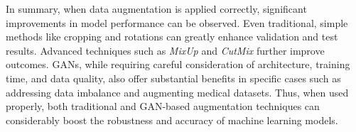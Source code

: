 In summary, when data augmentation is applied correctly, significant improvements in model performance can be observed. Even traditional, simple methods like cropping and rotations can greatly enhance validation and test results. Advanced techniques such as \textit{MixUp} and \textit{CutMix} further improve outcomes. GANs, while requiring careful consideration of architecture, training time, and data quality, also offer substantial benefits in specific cases such as addressing data imbalance and augmenting medical datasets. Thus, when used properly, both traditional and GAN-based augmentation techniques can considerably boost the robustness and accuracy of machine learning models.